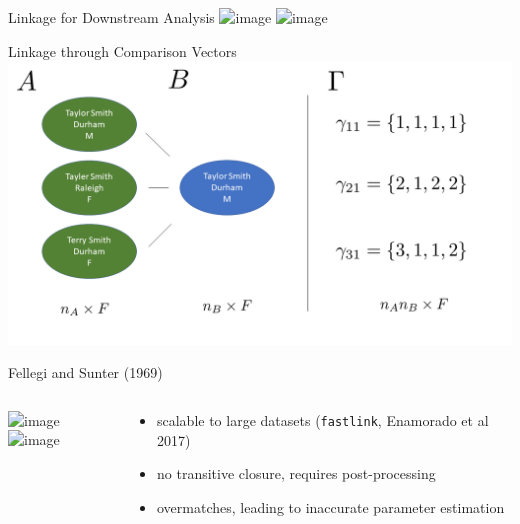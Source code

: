 \documentclass{beamer}
\begin{document}
	\begin{frame}{Linkage for Downstream Analysis}
	\includegraphics<1>[width = \textwidth, height = .7\textwidth ]{datasets.png}
	\includegraphics<2>[width = \textwidth, height = .7\textwidth ]{datasets_linked.png}

\end{frame}

	\begin{frame}{Linkage through Comparison Vectors}
		\includegraphics[width = \textwidth, height = .6\textwidth ]{fs_graphic.png}
	\end{frame}

\begin{frame}{Fellegi and Sunter (1969)}
	\begin{columns}
		\begin{column}{0.6\textwidth}
			\includegraphics<1>[width = \textwidth, height = 1.2\textwidth ]{rl_graphics_all/Slide1.png}
			\includegraphics<2->[width = \textwidth, height = 1.2\textwidth ]{rl_graphics_all/Slide2.png}

		\end{column}
		\begin{column}{0.38\textwidth}
			\begin{itemize}
				\item<3-> scalable to large datasets (\texttt{fastlink}, Enamorado et al 2017)
				\item<4-> no transitive closure, requires post-processing
				\pause 
				\item<5-> overmatches, leading to inaccurate parameter estimation
			\end{itemize}

		\end{column}
	\end{columns}
\end{frame}
\end{document}
